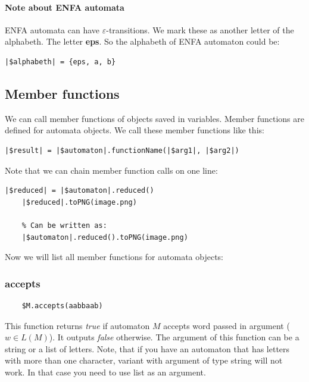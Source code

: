 \documentclass{ctuthesis}
\begin{document}
\paragraph{Note about ENFA automata}
ENFA automata can have $\varepsilon$-transitions. We mark these as another letter of the alphabeth. The letter \textbf{eps}. So the alphabeth of ENFA automaton could be:
\begin{lstlisting}[language = JASL]
	|$alphabeth| = {eps, a, b}
\end{lstlisting} 

\subsection{Member functions}
We can call member functions of objects saved in variables. Member functions are defined for automata objects. We call these member functions like this:
\begin{minipage}{\linewidth}
\begin{lstlisting}[language = JASL]
	|$result| = |$automaton|.functionName(|$arg1|, |$arg2|)	
\end{lstlisting}
\end{minipage} 

Note that we can chain member function calls on one line:

\begin{minipage}{\linewidth}
\begin{lstlisting}[language = JASL]
	|$reduced| = |$automaton|.reduced()
	|$reduced|.toPNG(image.png)
	
	% Can be written as:
	|$automaton|.reduced().toPNG(image.png)
\end{lstlisting}
\end{minipage}

Now we will list all member functions for automata objects:

\subsubsection{accepts}
\begin{verbatim}
	$M.accepts(aabbaab)
\end{verbatim}

This function returns \textit{true} if automaton $M$ accepts word passed in argument ($w \in L(M)$). It outputs \textit{false} otherwise. The argument of this function can be a string or a list of letters. Note, that if you have an automaton that has letters with more than one character, variant with argument of type string will not work. In that case you need to use list as an argument.
\end{document}
